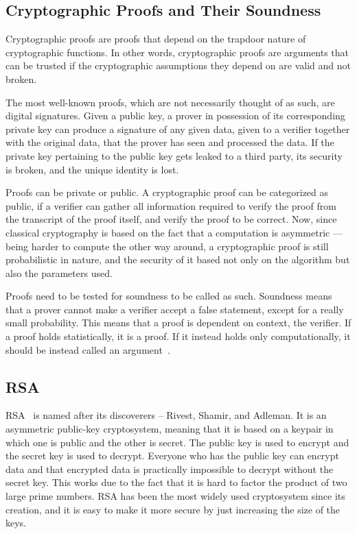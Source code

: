 \subsection{Cryptographic Proofs and Their Soundness}
Cryptographic proofs are proofs that depend on the trapdoor nature of cryptographic functions. In other words, cryptographic proofs are arguments that can be trusted if the cryptographic assumptions they depend on are valid and not broken.

The most well-known proofs, which are not necessarily thought of as such, are digital signatures. Given a public key, a prover in possession of its corresponding private key can produce a signature of any given data, given to a verifier together with the original data, that the prover has seen and processed the data. If the private key pertaining to the public key gets leaked to a third party, its security is broken, and the unique identity is lost.

Proofs can be private or public. A cryptographic proof can be categorized as public, if a verifier can gather all information required to verify the proof from the transcript of the proof itself, and verify the proof to be correct. Now, since classical cryptography is based on the fact that a computation is asymmetric --- being harder to compute the other way around, a cryptographic proof is still probabilistic in nature, and the security of it based not only on the algorithm but also the parameters used.

Proofs need to be tested for soundness to be called as such. Soundness means that a prover cannot make a verifier accept a false statement, except for a really small probability. This means that a proof is dependent on context, the verifier. If a proof holds statistically, it is a proof. If it instead holds only computationally, it should be instead called an argument~\cite{Chiesa2012-uz}.

\subsection{RSA}
RSA~\cite{Rivest1978-fm} is named after its discoverers -- Rivest, Shamir, and Adleman. It is an asymmetric public-key cryptosystem, meaning that it is based on a keypair in which one is public and the other is secret. The public key is used to encrypt and the secret key is used to decrypt. Everyone who has the public key can encrypt data and that encrypted data is practically impossible to decrypt without the secret key. This works due to the fact that it is hard to factor the product of two large prime numbers. RSA has been the most widely used cryptosystem since its creation, and it is easy to make it more secure by just increasing the size of the keys.

